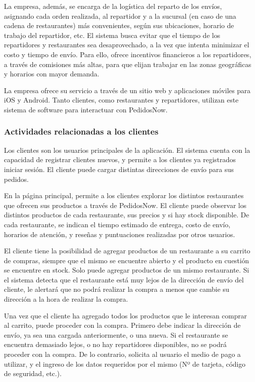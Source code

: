 La empresa, además, se encarga de la logística del reparto de los envíos, asignando cada orden realizada, al repartidor y a la sucursal (en caso de una cadena de restaurantes) más convenientes, según sus ubicaciones, horario de trabajo del repartidor, etc. El sistema busca evitar que el tiempo de los repartidores y restaurantes sea desaprovechado, a la vez que intenta minimizar el costo y tiempo de envío. Para ello, ofrece incentivos financieros a los repartidores, a través de comisiones más altas, para que elijan trabajar en las zonas geográficas y horarios con mayor demanda.

La empresa ofrece su servicio a través de un sitio web y aplicaciones móviles para iOS y Android. Tanto clientes, como restaurantes y repartidores, utilizan este sistema de software para interactuar con PedidosNow.

\subsubsection{Actividades relacionadas a los clientes}

Los clientes son los usuarios principales de la aplicación. El sistema cuenta con la capacidad de registrar clientes nuevos, y permite a los clientes ya registrados iniciar sesión. El cliente puede cargar distintas direcciones de envío para sus pedidos.

En la página principal, permite a los clientes explorar los distintos restaurantes que ofrecen sus productos a través de PedidosNow. El cliente puede observar los distintos productos de cada restaurante, sus precios y si hay stock disponible. De cada restaurante, se indican el tiempo estimado de entrega, costo de envío, horarios de atención, y reseñas y puntuaciones realizadas por otros usuarios.

El cliente tiene la posibilidad de agregar productos de un restaurante a su carrito de compras, siempre que el mismo se encuentre abierto y el producto en cuestión se encuentre en stock. Solo puede agregar productos de un mismo restaurante. Si el sistema detecta que el restaurante está muy lejos de la dirección de envío del cliente, le alertará que no podrá realizar la compra a menos que cambie su dirección a la hora de realizar la compra.

Una vez que el cliente ha agregado todos los productos que le interesan comprar al carrito, puede proceder con la compra. Primero debe indicar la dirección de envío, ya sea una cargada anteriormente, o una nueva. Si el restaurante se encuentra demasiado lejos, o no hay repartidores disponibles, no se podrá proceder con la compra. De lo contrario, solicita al usuario el medio de pago a utilizar, y el ingreso de los datos requeridos por el mismo (Nº de tarjeta, código de seguridad, etc.).

